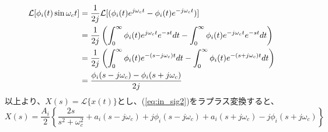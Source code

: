 \documentclass[book]{jlreq}
\begin{document}
%
\begin{align}
    \mathcal{L} [\phi_i(t)\sin\omega_c t]
     & = \frac{1}{2j}\mathcal{L}[(\phi_i(t) e^{j\omega_c t} - \phi_i(t) e^{-j\omega_c t})]\notag \\
     & = \frac{1}{2j}\left(\int_0^\infty \phi_i(t) e^{j\omega_c t} e^{-st} dt -
    \int_0^\infty \phi_i(t) e^{-j\omega_c t} e^{-st} dt \right)\notag                            \\
     & = \frac{1}{2j}\left(\int_0^\infty \phi_i(t) e^{-(s-j\omega_c) t} dt -
    \int_0^\infty \phi_i(t) e^{-(s+j\omega_c) t} dt \right)\notag                                \\
     & = \frac{\phi_i(s-j\omega_c) - \phi_i(s+j\omega_c)}{2j}
\end{align}
%
以上より、$X(s) = \mathcal{L}\{x(t)\}$とし、(\ref{eq:in_sig2})をラプラス変換すると、
%
\begin{equation}
    X(s) = \frac{A_i}{2}\left\{ \frac{2s}{s^2+\omega_c^2}
    + a_i(s-j\omega_c) + j\phi_i(s-j\omega_c)
    + a_i(s+j\omega_c) - j\phi_i(s+j\omega_c) \right\}
\end{equation}
\end{document}
